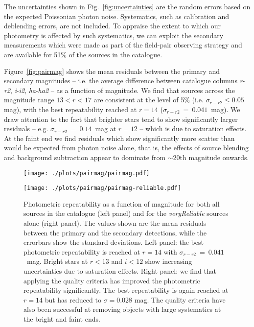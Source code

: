 \documentclass[useAMS,usenatbib]{mn2e}
\begin{document}
The uncertainties shown in Fig.~\ref{fig:uncertainties}
are the random errors based on the expected Poissonian photon noise.
Systematics, such as calibration and deblending errors,
are not included.
To appraise the extent to which our photometry is affected
by such systematics, we can exploit the
secondary measurements which were made as part of the
field-pair observing strategy and are available for 51\%
of the sources in the catalogue.

Figure~\ref{fig:pairmag} shows the mean residuals between
the primary and secondary magnitudes
-- i.e. the average difference between catalogue columns \emph{r}-\emph{r2},
\emph{i}-\emph{i2}, \emph{ha}-\emph{ha2} -- as a function of magnitude.
We find that sources across the magnitude range 
$13 < r < 17$ are consistent at the level of 5\%
(i.e. $\sigma_{r-r2} \le 0.05$ mag),
with the best repeatability
reached at $r=14$ ($\sigma_{r-r2}~=~0.041$~mag).
We draw attention to the fact that brighter stars
tend to show significantly larger residuals
-- e.g. $\sigma_{r-r2}~=~0.14$~mag at $r=12$ --
which is due to saturation effects.
At the faint end we find residuals which
show significantly more scatter than would be expected
from photon noise alone, that is,
the effects of source blending and background subtraction
appear to dominate from $\sim$20th magnitude onwards.

\begin{figure*}
\begin{minipage}[b]{0.45\linewidth}
\centering
\texttt{[image: ./plots/pairmag/pairmag.pdf]}
\label{fig:pairmag}
\end{minipage}
\hspace{0.5cm}
\begin{minipage}[b]{0.45\linewidth}
\centering
\texttt{[image: ./plots/pairmag/pairmag-reliable.pdf]}
\label{fig:pairmag_reliable}
\end{minipage}
\caption{Photometric repeatability as a function of magnitude
         for both all sources in the catalogue (left panel)
         and for the \emph{veryReliable} sources alone (right panel).
         The values shown are the mean residuals
         between the primary and the secondary detections,
         while the errorbars show the standard deviations.
         Left panel: 
         the best photometric repeatability is reached at $r=14$
         with $\sigma_{r-r2}~=~0.041$~mag.
         Bright stars at $r<13$ and $i<12$ 
         show increasing uncertainties due to saturation effects.
         Right panel: we find that applying the quality criteria
         has improved the photometric repeatability significantly.
         The best repeatability is again reached at $r=14$
         but has reduced to $\sigma=0.028$ mag.
         The quality criteria have also been successful
         at removing objects with large systematics at the bright
         and faint ends.
    }
\end{figure*}
\end{document}

